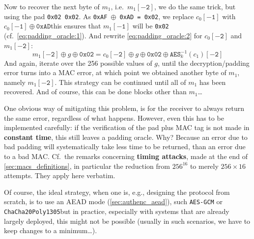   Now to recover the next byte of $m_1$, i.e.\ $m_1\mathtt{[-2]}$, we do the same trick, but using the pad \texttt{0x02 0x02}. As \texttt{0xAF $\oplus$ 0xAD = 0x02}, we replace $c_0\mathtt{[-1]}$ with $c_0\mathtt{[-1]} \oplus \mathtt{0xAD}$\emd this ensures that $m_1\mathtt{[-1]}$ will be \texttt{0x02} (cf.\ \eqref{eq:padding_oracle:1}). And rewrite \eqref{eq:padding_oracle:2} for $c_0\mathtt{[-2]}$ and $m_1\mathtt{[-2]}$:
  \begin{equation}
    \label{eq:padding_oracle:5}
    m_1\mathtt{[-2]} \oplus g \oplus \texttt{0x02} = c_0\mathtt{[-2]} \oplus g \oplus \texttt{0x02} \oplus \texttt{AES}_k^{-1}(c_1)\mathtt{[-2]}
  \end{equation}
  And again, iterate over the 256 possible values of $g$, until the decryption/padding error turns into a MAC error, at which point we obtained another byte of $m_1$, namely $m_1\mathtt{[-2]}$. This strategy can be continued until all of $m_1$ has been recovered. And of course, this can be done blocks other than $m_1$\dots

  \bigskip

   One obvious way of mitigating this problem, is for the receiver to always return the same error, regardless of what happens. However, even this has to be implemented carefully: if the verification of the pad plus MAC tag is not made in \textbf{constant time}, this still leaves a padding oracle. Why? Because an error due to bad padding will systematically take less time to be returned, than an error due to a bad MAC. Cf.\ the remarks concerning \textbf{timing attacks}, made at the end of \ts\ref{sec:macs_definitions}, in particular the reduction from $256^{16}$ to merely $256\times 16$ attempts. They apply here verbatim.

  Of course, the ideal strategy, when one is, e.g., designing the protocol from scratch, is to use an AEAD mode (\ts\ref{sec:authenc_aead}), such \texttt{AES-GCM} or \texttt{ChaCha20Poly1305}\emd but in practice, especially with systems that are already largely deployed, this might not be possible (usually in such scenarios, we have to keep changes to a minimum\dots).


